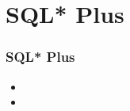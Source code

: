 \section{ SQL* Plus}

\begin{frame}

	\frametitle{ SQL* Plus}
	
	\begin{itemize}
	
	    \item
	
	    \item
	
	\end{itemize}
	
\end{frame}